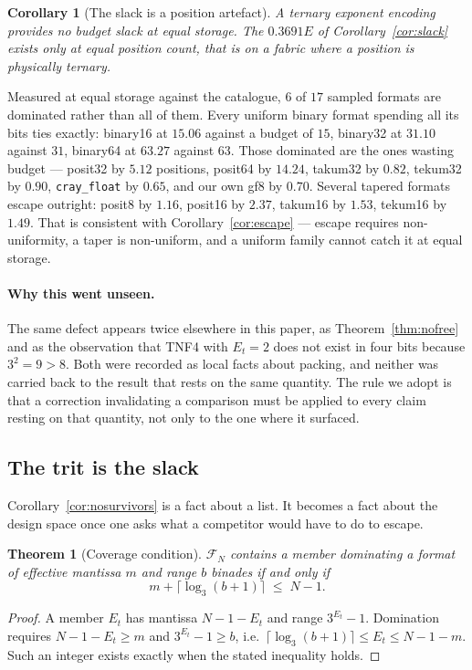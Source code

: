 \documentclass[11pt]{article}
\newtheorem{theorem}{Theorem}
\newtheorem{corollary}{Corollary}
\theoremstyle{definition}
\begin{document}
\begin{corollary}[The slack is a position artefact]
\label{cor:slackartefact}
A ternary exponent encoding provides no budget slack at equal storage. The
$0.3691E$ of Corollary~\ref{cor:slack} exists only at equal \emph{position}
count, that is on a fabric where a position is physically ternary.
\end{corollary}

Measured at equal storage against the catalogue, $6$ of $17$ sampled formats are
dominated rather than all of them. Every uniform binary format spending all its
bits ties exactly: binary16 at $15.06$ against a budget of $15$, binary32 at
$31.10$ against $31$, binary64 at $63.27$ against $63$. Those dominated are the
ones wasting budget --- posit32 by $5.12$ positions, posit64 by $14.24$, takum32
by $0.82$, tekum32 by $0.90$, \texttt{cray\_float} by $0.65$, and our own gf8 by
$0.70$. Several tapered formats escape outright: posit8 by $1.16$, posit16 by
$2.37$, takum16 by $1.53$, tekum16 by $1.49$. That is consistent with
Corollary~\ref{cor:escape} --- escape requires non-uniformity, a taper is
non-uniform, and a uniform family cannot catch it at equal storage.

\paragraph{Why this went unseen.} The same defect appears twice elsewhere in this
paper, as Theorem~\ref{thm:nofree} and as the observation that TNF4 with $E_t=2$
does not exist in four bits because $3^{2}=9>8$. Both were recorded as local
facts about packing, and neither was carried back to the result that rests on the
same quantity. The rule we adopt is that a correction invalidating a comparison
must be applied to every claim resting on that quantity, not only to the one
where it surfaced.


\subsection{The trit is the slack}
\label{sec:slack}

Corollary~\ref{cor:nosurvivors} is a fact about a list. It becomes a fact about
the design space once one asks what a competitor would have to do to escape.

\begin{theorem}[Coverage condition]
\label{thm:coverage}
$\mathcal{F}_N$ contains a member dominating a format of effective mantissa $m$
and range $b$ binades if and only if
\[
  m + \lceil \log_3 (b+1) \rceil \;\le\; N-1 .
\]
\end{theorem}
\begin{proof}
A member $E_t$ has mantissa $N-1-E_t$ and range $3^{E_t}-1$. Domination requires
$N-1-E_t \ge m$ and $3^{E_t}-1 \ge b$, i.e.\ $\lceil\log_3(b+1)\rceil \le E_t \le
N-1-m$. Such an integer exists exactly when the stated inequality holds.
\end{proof}
\end{document}
